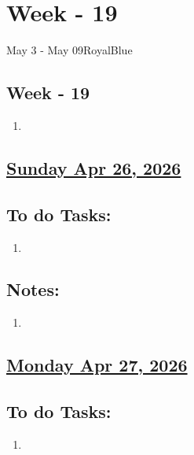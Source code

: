 \section{Week - 19}
\begin{physicsmodule}{May 3 - May 09}{RoyalBlue}
  \begin{lawbox}
    \subsection*{ Week - 19}
    \begin{enumerate}
    \item 
\end{enumerate}
  \end{lawbox}
\end{physicsmodule}
\subsection*{\underline{Sunday Apr 26, 2026}}
\subsection*{To do Tasks:}
\begin{enumerate}
    \item 
\end{enumerate}
\subsection*{Notes:}
\begin{enumerate}
    \item 
\end{enumerate}
\subsection*{\underline{Monday Apr 27, 2026}}
\subsection*{To do Tasks:}
\begin{enumerate}
    \item 
\end{enumerate}
